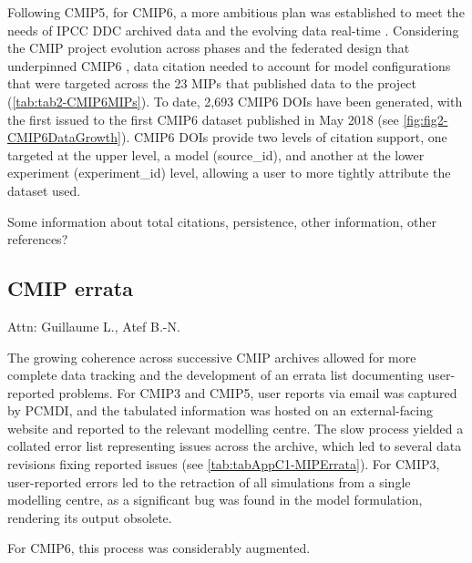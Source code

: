 \documentclass[gmd, preprint]{copernicus}
\newcommand{\mycomment}[1]{}
\def\cred#1{{\color{red}#1}}
\begin{document}
Following CMIP5, for CMIP6, a more ambitious plan was established to meet the needs of IPCC DDC archived data and the evolving data real-time \citep{stockhause_cmip6_2017}. Considering the CMIP project evolution across phases and the federated design that underpinned CMIP6 \citep[see \autoref{sec:cmip6ProjectDesign};][]{eyring_overview_2016}, data citation needed to account for model configurations that were targeted across the 23 MIPs that published data to the project (\autoref{tab:tab2-CMIP6MIPs}). To date, 2,693 CMIP6 DOIs have been generated, with the first issued to the first CMIP6 dataset published in May 2018 (see \autoref{fig:fig2-CMIP6DataGrowth}). CMIP6 DOIs provide two levels of citation support, one targeted at the upper level, a model (source\_id), and another at the lower experiment (experiment\_id) level, allowing a user to more tightly attribute the dataset used.

\cred{Some information about total citations, persistence, other information, other references?}
\mycomment{
https://www.ipcc-data.org/sim/gcm_monthly/AR5/WG1-Archive.html
https://www.wdc-climate.de/ui/statistics?type=cmip6_doi_registration
https://commons.datacite.org/repositories/8orcv25 - Master overview 6012 citations
https://www.wdc-climate.de/ords/f?p=127:2 - CMIP6 data references
https://www.wdc-climate.de/ui/cmip6?input=CMIP6.ScenarioMIP.NOAA-GFDL.GFDL-CM4.ssp585
https://www.wdc-climate.de/ui/cmip6?input=input4MIPs.CMIP6.CMIP.PCMDI
}


\subsection{CMIP errata}
\label{sec:CMIPErrata}
\cred{Attn: Guillaume L., Atef B.-N.}

The growing coherence across successive CMIP archives allowed for more complete data tracking and the development of an errata list documenting user-reported problems. For CMIP3 and CMIP5, user reports via email was captured by PCMDI, and the tabulated information was hosted on an external-facing website and reported to the relevant modelling centre. The slow process yielded a collated error list representing issues across the archive, which led to several data revisions fixing reported issues (see \autoref{tab:tabAppC1-MIPErrata}). For CMIP3, user-reported errors led to the retraction of all simulations from a single modelling centre, as a significant bug was found in the model formulation, rendering its output obsolete.

\cred{For CMIP6, this process was considerably augmented.}
\end{document}
